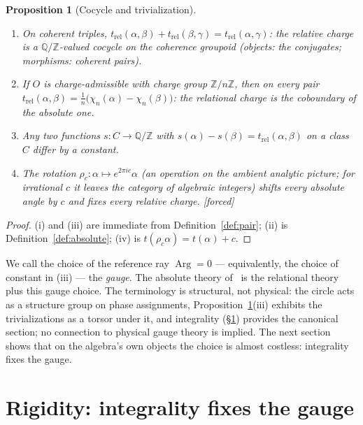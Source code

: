 \documentclass[11pt]{article}
\theoremstyle{plain}
\newtheorem{proposition}[theorem]{Proposition}
\theoremstyle{definition}
\theoremstyle{remark}
\newcommand{\Q}{\mathbb{Q}}
\newcommand{\Z}{\mathbb{Z}}
\DeclareMathOperator{\Arg}{Arg}
\newcommand{\tors}{\Q/\Z}
\newcommand{\F}{\textnormal{[forced]}}
\begin{document}
\begin{proposition}[Cocycle and trivialization]\label{prop:gauge}
\leavevmode
\begin{enumerate}
\item[(i)] On coherent triples, $t_{\mathrm{rel}}(\alpha,\beta)+
  t_{\mathrm{rel}}(\beta,\gamma)=t_{\mathrm{rel}}(\alpha,\gamma)$: the relative
  charge is a $\tors$-valued cocycle on the coherence groupoid (objects: the
  conjugates; morphisms: coherent pairs).
\item[(ii)] If $O$ is charge-admissible with charge group $\Z/n\Z$, then on every
  pair $t_{\mathrm{rel}}(\alpha,\beta)=\frac{1}{n}\bigl(\chi_n(\alpha)-
  \chi_n(\beta)\bigr)$: the relational charge is the coboundary of the absolute
  one.
\item[(iii)] Any two functions $s:C\to\tors$ with $s(\alpha)-s(\beta)=
  t_{\mathrm{rel}}(\alpha,\beta)$ on a class $C$ differ by a constant.
\item[(iv)] The rotation $\rho_c:\alpha\mapsto e^{2\pi ic}\alpha$ (an operation on
  the ambient analytic picture; for irrational $c$ it leaves the category of
  algebraic integers) shifts every absolute angle by $c$ and fixes every relative
  charge. \F
\end{enumerate}
\end{proposition}

\begin{proof}
(i) and (iii) are immediate from Definition~\ref{def:pair}; (ii) is
Definition~\ref{def:absolute}; (iv) is $t(\rho_c\alpha)=t(\alpha)+c$.
\end{proof}

We call the choice of the reference ray $\Arg=0$ --- equivalently, the choice of
constant in (iii) --- the \emph{gauge}. The absolute theory of~\cite{CMC} is the
relational theory plus this gauge choice. The terminology is structural, not
physical: the circle acts as a structure group on phase assignments,
Proposition~\ref{prop:gauge}(iii) exhibits the trivializations as a torsor
under it, and integrality (\S\ref{sec:rigidity}) provides the canonical
section; no connection to physical gauge theory is implied. The next section
shows that on the
algebra's own objects the choice is almost costless: integrality fixes the gauge.

\section{Rigidity: integrality fixes the gauge}\label{sec:rigidity}
\end{document}
